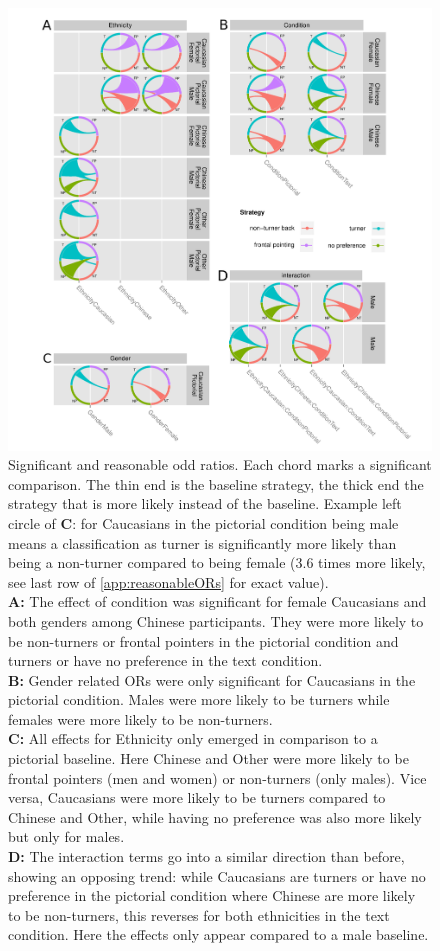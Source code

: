 \documentclass{frontiersSCNS} %
\begin{document}
\begin{figure}[htbp]
  \centering
    \includegraphics[width= \textwidth]{figures/odd_ratios.pdf}
   \caption{ \footnotesize Significant and reasonable odd ratios. Each chord marks a significant comparison. The thin end is the baseline strategy, the thick end the strategy that is more likely instead of the baseline. Example left circle of \textbf{C}: for Caucasians in the pictorial condition being male means a classification as turner is significantly more likely than being a non-turner compared to being female (3.6 times more likely, see last row of \ref{app:reasonableORs} for exact value). \\
   \textbf{A:} The effect of condition was significant for female Caucasians and both genders among Chinese participants. They were more likely to be non-turners or frontal pointers in the pictorial condition and turners or have no preference in the text condition. \\
   \textbf{B:} Gender related ORs were only significant for Caucasians in the pictorial condition. Males were more likely to be turners while females were more likely to be non-turners. \\
   \textbf{C:} All effects for Ethnicity only emerged in comparison to a pictorial baseline. Here Chinese and Other were more likely to be frontal pointers (men and women) or non-turners (only males). Vice versa, Caucasians were more likely to be turners compared to Chinese and Other, while having no preference was also more likely but only for males. \\
   \textbf{D:} The interaction terms go into a similar direction than before, showing an opposing trend: while Caucasians are turners or have no preference in the pictorial condition where Chinese are more likely to be non-turners, this reverses for both ethnicities in the text condition. Here the effects only appear compared to a male baseline.}
   \label{fig:odd_ratios}
\end{figure}
\end{document}
